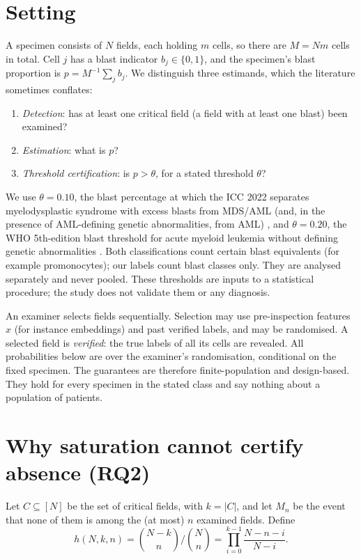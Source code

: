 \documentclass[11pt]{article}
\theoremstyle{remark}
\theoremstyle{definition}
\begin{document}
\section{Setting}
A specimen consists of $N$ fields, each holding $m$ cells, so there are $M=Nm$ cells in total. Cell $j$ has a blast indicator $b_j\in\{0,1\}$, and the specimen's blast proportion is $p=M^{-1}\sum_j b_j$. We distinguish three estimands, which the literature sometimes conflates:
\begin{enumerate}
\item \emph{Detection}: has at least one critical field (a field with at least one blast) been examined?
\item \emph{Estimation}: what is $p$?
\item \emph{Threshold certification}: is $p>\theta$, for a stated threshold $\theta$?
\end{enumerate}
We use $\theta=0.10$, the blast percentage at which the ICC 2022 separates myelodysplastic syndrome with excess blasts from MDS/AML (and, in the presence of AML-defining genetic abnormalities, from AML) \cite{arber2022icc}, and $\theta=0.20$, the WHO 5th-edition blast threshold for acute myeloid leukemia without defining genetic abnormalities \cite{khoury2022who}. Both classifications count certain blast equivalents (for example promonocytes); our labels count blast classes only. They are analysed separately and never pooled. These thresholds are inputs to a statistical procedure; the study does not validate them or any diagnosis.

An examiner selects fields sequentially. Selection may use pre-inspection features $x$ (for instance embeddings) and past verified labels, and may be randomised. A selected field is \emph{verified}: the true labels of all its cells are revealed. All probabilities below are over the examiner's randomisation, conditional on the fixed specimen. The guarantees are therefore finite-population and design-based. They hold for every specimen in the stated class and say nothing about a population of patients.

\section{Why saturation cannot certify absence (RQ2)}\label{sec:theory}
Let $C\subseteq[N]$ be the set of critical fields, with $k=|C|$, and let $M_n$ be the event that none of them is among the (at most) $n$ examined fields. Define
\[
h(N,k,n)=\binom{N-k}{n}\Big/\binom{N}{n}=\prod_{i=0}^{k-1}\frac{N-n-i}{N-i}.
\]
\end{document}
